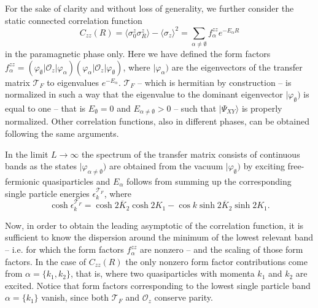 \documentclass[prl,twocolumn,showpacs,floatfix,superscriptaddress,nofootinbib]{revtex4-1}
\begin{document}
For the sake of clarity and without loss of generality, we further consider the static connected correlation function
\begin{equation} \label{eq:correlations}
C_{zz}(R)= \langle \sigma^z_0 \sigma^z_R \rangle - \langle \sigma_z \rangle^2 =  \sum_{\alpha \neq \emptyset} f_\alpha^{zz} e^{ - E_\alpha R}
\end{equation}
in the paramagnetic phase only. 
Here we have defined the form factors 
$f_\alpha^{zz} = ( \varphi_\emptyset \vert \mathcal{O}_z  \vert \varphi_\alpha ) ( \varphi_\alpha \vert \mathcal{O}_z  \vert \varphi_\emptyset )$, 
where $|\varphi_\alpha )$ are the eigenvectors of the transfer matrix ${\mathcal{T}_F}$ to eigenvalues $e^{- E_\alpha }$.
${\mathcal{T}_F}$ -- which is hermitian by construction -- is normalized in such a way that the eigenvalue to the dominant eigenvector $|\varphi_\emptyset)$ is equal to one -- that is $E_\emptyset=0$ and $E_{\alpha\neq\emptyset} > 0$ -- such that $\vert\Psi_{XY} \rangle$ is properly normalized.
Other correlation functions, also in different phases, can be obtained following the same arguments.
                                 
In the limit $L\rightarrow \infty$ the spectrum of the transfer matrix consists of continuous bands as the states $\vert\varphi_{\alpha \neq \emptyset})$ are obtained from the vacuum $\vert \varphi_\emptyset )$ by exciting free-fermionic quasiparticles and  $E_\alpha$ follows from summing up the corresponding single particle energies $\epsilon_k^{\mathcal{T}_F}$, where
\begin{equation*}
\cosh \epsilon_k^{\mathcal{T}_F} = \cosh 2 \overline K_2 \cosh 2 K_1 - \cos k \sinh 2 \overline K_2 \sinh 2 K_1.
\end{equation*}

Now, in order to obtain the leading asymptotic of the correlation function, it is sufficient to know the dispersion around the minimum of the lowest relevant band -- i.e. for which the form factors $f_\alpha^{zz}$ are nonzero -- and the scaling of those form factors.
In the case of $C_{zz}(R)$ the only nonzero form factor contributions come from $\alpha = \{k_1,k_2 \}$, that is, where two quasiparticles with momenta $k_1$ and $k_2$ are excited.
Notice that form factors corresponding to the lowest single particle band $\alpha=\{k_1\}$ vanish, since both $\mathcal{T}_{F}$ and $\mathcal{O}_z$ conserve parity.
\end{document}
